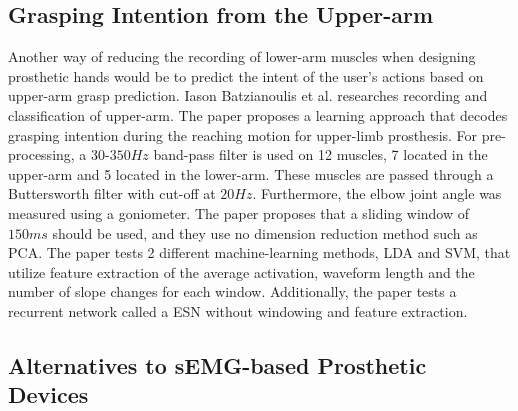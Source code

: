 \documentclass[../main.tex]{subfiles}
\begin{document}
\subsection{Grasping Intention from the Upper-arm}

Another way of reducing the recording of lower-arm muscles when designing prosthetic hands would be to predict the intent of the user's actions based on upper-arm grasp prediction.
Iason Batzianoulis et al. \cite{Batzianoulis2018} researches recording and classification of upper-arm.
The paper proposes a learning approach that decodes grasping intention during the reaching motion for upper-limb prosthesis.
For pre-processing, a $30$-$350Hz$ band-pass filter is used on 12 muscles, 7 located in the upper-arm and 5 located in the lower-arm.
These muscles are passed through a Buttersworth filter with cut-off at $20Hz$.
Furthermore, the elbow joint angle was measured using a \gls{goniometer}.
The paper proposes that a sliding window of $150ms$ should be used, and they use no dimension reduction method such as \gls{PCA}.
The paper tests 2 different machine-learning methods, \gls{LDA} and \gls{SVM}, that utilize feature extraction of the average activation, waveform length and the number of slope changes for each window.
Additionally, the paper tests a recurrent network called a \gls{ESN} without windowing and feature extraction.

\subsection{Alternatives to sEMG-based Prosthetic Devices}
\end{document}
